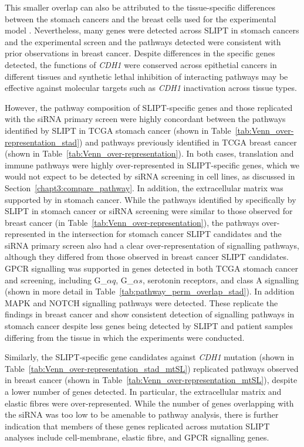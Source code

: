 This smaller overlap can also be attributed to the tissue-specific differences between the stomach cancers and the breast cells used for the experimental model \citep{Chen2014}. Nevertheless, many genes were detected across \gls{SLIPT} in stomach cancers and the experimental screen \citep{Telford2015} and the pathways detected were consistent with prior observations in breast cancer. Despite differences in the specific genes detected, the functions of \textit{CDH1} were conserved across epithetial cancers in different tissues and synthetic lethal inhibition of interacting pathways may be effective against molecular targets such as \textit{CDH1} inactivation across tissue types.

However, the pathway composition of \gls{SLIPT}-specific genes and those replicated with the siRNA primary screen \citep{Telford2015} were highly concordant between the pathways identified by \gls{SLIPT} in TCGA stomach cancer (shown in Table~\ref{tab:Venn_over-representation_stad}) and pathways previously identified in TCGA breast cancer (shown in Table~\ref{tab:Venn_over-representation}). In both cases, translation and immune pathways were highly over-represented in \gls{SLIPT}-specific genes, which we would not expect to be detected by siRNA screening in cell lines, as discussed in Section~\ref{chapt3:compare_pathway}. In addition, the extracellular matrix was supported by in stomach cancer. While the pathways identified by specifically by \gls{SLIPT} in stomach cancer or siRNA screening were similar to those observed for breast cancer (in Table~\ref{tab:Venn_over-representation}), the pathways over-represented in the intersection for stomach cancer \gls{SLIPT} candidates and the siRNA primary screen \citep{Telford2015} also had a clear over-representation of signalling pathways, although they differed from those observed in breast cancer \gls{SLIPT} candidates. GPCR signalling was supported in genes detected in both TCGA stomach cancer and screening, including G_${\alpha q}$, G_${\alpha s}$, serotonin receptors, and class A signalling (shown in more detail in Table~\ref{tab:pathway_perm_overlap_stad}). In addition MAPK and NOTCH signalling pathways were detected. These replicate the findings in breast cancer and show consistent detection of signalling pathways in stomach cancer despite less genes being detected by \gls{SLIPT} and patient samples differing from the tissue in which the experiments were conducted.

Similarly, the \gls{SLIPT}-specific gene candidates against \textit{CDH1} mutation (shown in Table~\ref{tab:Venn_over-representation_stad_mtSL}) replicated pathways observed in breast cancer (shown in Table~\ref{tab:Venn_over-representation_mtSL}), despite a lower number of genes detected. In particular, the extracellular matrix and elastic fibres were over-represented. While the number of genes overlapping with the siRNA was too low to be amenable to pathway analysis, there is further indication that members of these genes replicated across mutation \gls{SLIPT} analyses include cell-membrane, elastic fibre, and GPCR signalling genes. 

